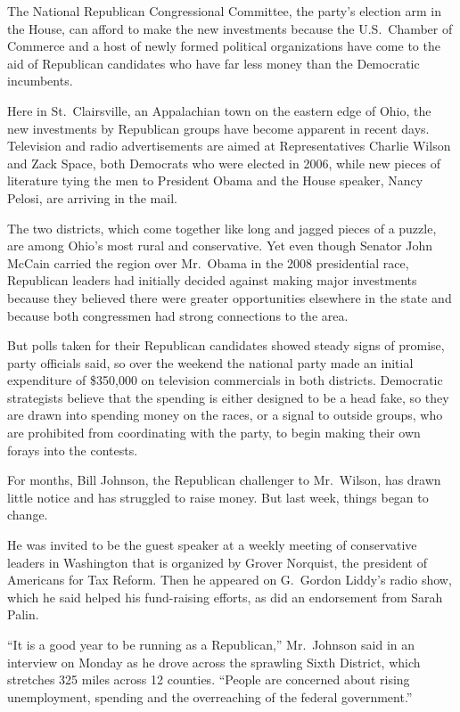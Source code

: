 ﻿\documentclass[12pt]{article}
\begin{document}
The National Republican Congressional Committee, the party's election arm in the House, can afford
to make the new investments because the U.S.~Chamber of Commerce and a host of newly formed
political organizations have come to the aid of Republican candidates who have far less money than
the Democratic incumbents.

Here in St.~Clairsville, an Appalachian town on the eastern edge of Ohio, the new investments by
Republican groups have become apparent in recent days. Television and radio advertisements are aimed
at Representatives Charlie Wilson and Zack Space, both Democrats who were elected in 2006, while new
pieces of literature tying the men to President Obama and the House speaker, Nancy Pelosi, are
arriving in the mail.

The two districts, which come together like long and jagged pieces of a puzzle, are among Ohio's
most rural and conservative. Yet even though Senator John McCain carried the region over Mr.~Obama
in the 2008 presidential race, Republican leaders had initially decided against making major
investments because they believed there were greater opportunities elsewhere in the state and
because both congressmen had strong connections to the area.

But polls taken for their Republican candidates showed steady signs of promise, party officials
said, so over the weekend the national party made an initial expenditure of \$350,000 on television
commercials in both districts. Democratic strategists believe that the spending is either designed
to be a head fake, so they are drawn into spending money on the races, or a signal to outside
groups, who are prohibited from coordinating with the party, to begin making their own forays into
the contests.

For months, Bill Johnson, the Republican challenger to Mr.~Wilson, has drawn little notice and has
struggled to raise money. But last week, things began to change.

He was invited to be the guest speaker at a weekly meeting of conservative leaders in Washington
that is organized by Grover Norquist, the president of Americans for Tax Reform. Then he appeared on
G.~Gordon Liddy's radio show, which he said helped his fund-raising efforts, as did an endorsement
from Sarah Palin.

``It is a good year to be running as a Republican,'' Mr.~Johnson said in an interview on Monday as
he drove across the sprawling Sixth District, which stretches 325 miles across 12 counties. ``People
are concerned about rising unemployment, spending and the overreaching of the federal government.''
\end{document}
